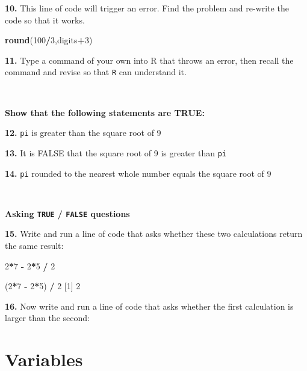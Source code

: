 \documentclass[
]{book}
\newenvironment{Shaded}{\begin{snugshade}}{\end{snugshade}}
\newcommand{\DecValTok}[1]{\textcolor[rgb]{0.00,0.00,0.81}{#1}}
\newcommand{\FunctionTok}[1]{\textcolor[rgb]{0.13,0.29,0.53}{\textbf{#1}}}
\newcommand{\NormalTok}[1]{#1}
\newcommand{\SpecialCharTok}[1]{\textcolor[rgb]{0.81,0.36,0.00}{\textbf{#1}}}
\begin{document}
\textbf{10.} This line of code will trigger an error. Find the problem and re-write the code so that it works.

\begin{Shaded}
\begin{Highlighting}[]
\FunctionTok{round}\NormalTok{(}\DecValTok{100}\SpecialCharTok{/}\DecValTok{3}\NormalTok{,digits}\SpecialCharTok{+}\DecValTok{3}\NormalTok{)}
\end{Highlighting}
\end{Shaded}

\textbf{11.} Type a command of your own into R that throws an error, then recall the command and revise so that \texttt{R} can understand it.

~

\textbf{Show that the following statements are TRUE:}

\textbf{12.} \texttt{pi} is greater than the square root of 9

\textbf{13.} It is FALSE that the square root of 9 is greater than \texttt{pi}

\textbf{14.} \texttt{pi} rounded to the nearest whole number equals the square root of 9

~

\textbf{Asking \texttt{TRUE} / \texttt{FALSE} questions}

\textbf{15.} Write and run a line of code that asks whether these two calculations return the same result:

\begin{Shaded}
\begin{Highlighting}[]
\DecValTok{2}\SpecialCharTok{*}\DecValTok{7} \SpecialCharTok{{-}} \DecValTok{2}\SpecialCharTok{*}\DecValTok{5} \SpecialCharTok{/} \DecValTok{2}
\end{Highlighting}
\end{Shaded}

\begin{Shaded}
\begin{Highlighting}[]
\NormalTok{(}\DecValTok{2}\SpecialCharTok{*}\DecValTok{7} \SpecialCharTok{{-}} \DecValTok{2}\SpecialCharTok{*}\DecValTok{5}\NormalTok{) }\SpecialCharTok{/} \DecValTok{2}
\NormalTok{[}\DecValTok{1}\NormalTok{] }\DecValTok{2}
\end{Highlighting}
\end{Shaded}

\textbf{16.} Now write and run a line of code that asks whether the first calculation is larger than the second:

\chapter{Variables}\label{variables}
\end{document}
